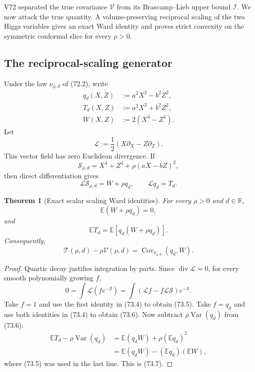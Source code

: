 \documentclass[11pt]{article}
\newtheorem{theorem}{Theorem}[section]
\theoremstyle{remark}
\begin{document}
V72 separated the true covariance \(\mathcal V\) from its
Brascamp--Lieb upper bound \(\mathcal I\).  We now attack the true
quantity.  A volume-preserving reciprocal scaling of the two Higgs
variables gives an exact Ward identity and proves strict convexity on
the symmetric conformal slice for every \(\rho>0\).

\subsection{The reciprocal-scaling generator}

Under the law \(\nu_{\rho,d}\) of (72.2), write
\[
\begin{aligned}
 q_d(X,Z)&:=a^2X^2-b^2Z^2,\\
 T_d(X,Z)&:=a^2X^2+b^2Z^2,\\
 W(X,Z)&:=2(X^4-Z^4).                             \tag{73.1}
\end{aligned}
\]
Let
\[
 \mathcal L:=\frac12(X\partial_X-Z\partial_Z).   \tag{73.2}
\]
This vector field has zero Euclidean divergence.  If
\[
 \mathcal S_{\rho,d}=X^4+Z^4+\rho(aX-bZ)^2,       \tag{73.3}
\]
then direct differentiation gives
\[
 \mathcal L\mathcal S_{\rho,d}=W+\rho q_d,
 \qquad
 \mathcal Lq_d=T_d.                              \tag{73.4}
\]

\begin{theorem}[Exact scalar scaling Ward identities]
\label{thm:v17v73-ward}
For every \(\rho>0\) and \(d\in\mathbb R\),
\[
\boxed{
 \mathbb E(W+\rho q_d)=0,}                       \tag{73.5}
\]
and
\[
\boxed{
 \mathbb ET_d
 =\mathbb E[q_d(W+\rho q_d)].}                   \tag{73.6}
\]
Consequently,
\[
\boxed{
 \mathcal T(\rho,d)-\rho\mathcal V(\rho,d)
 =\operatorname{Cov}_{\nu_{\rho,d}}(q_d,W).}     \tag{73.7}
\]
\end{theorem}

\begin{proof}
Quartic decay justifies integration by parts.  Since
\(\operatorname{div}\mathcal L=0\), for every smooth polynomially
growing \(f\),
\[
 0=\int\mathcal L(fe^{-\mathcal S})
 =\int(\mathcal Lf-f\mathcal L\mathcal S)e^{-\mathcal S}.
                                                               \tag{73.8}
\]
Take \(f=1\) and use the first identity in (73.4) to obtain (73.5).
Take \(f=q_d\) and use both identities in (73.4) to obtain (73.6).
Now subtract \(\rho\operatorname{Var}(q_d)\) from (73.6):
\[
\begin{aligned}
 \mathbb ET_d-\rho\operatorname{Var}(q_d)
 &=\mathbb E(q_dW)+\rho(\mathbb Eq_d)^2\\
 &=\mathbb E(q_dW)-(\mathbb Eq_d)(\mathbb EW),
\end{aligned}
\]
where (73.5) was used in the last line.  This is (73.7).
\end{proof}
\end{document}
